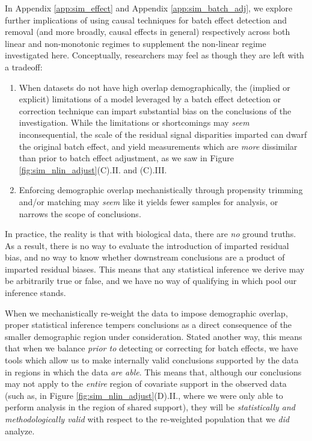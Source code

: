In Appendix \ref{app:sim_effect} and Appendix \ref{app:sim_batch_adj}, we explore further implications of using causal techniques for batch effect detection and removal (and more broadly, causal effects in general) respectively across both linear and non-monotonic regimes to supplement the non-linear regime investigated here. Conceptually, researchers may feel as though they are left with a tradeoff:
\begin{enumerate}[leftmargin=*]
    \item When datasets do not have high overlap demographically, the (implied or explicit) limitations of a model leveraged by a batch effect detection or correction technique can impart substantial bias on the conclusions of the investigation. While the limitations or shortcomings may \textit{seem} inconsequential, the scale of the residual signal disparities imparted can dwarf the original batch effect, and yield measurements which are \textit{more} dissimilar than prior to batch effect adjustment, as we saw in Figure \ref{fig:sim_nlin_adjust}(C).II. and (C).III.
    \item Enforcing demographic overlap mechanistically through propensity trimming and/or matching may \textit{seem} like it yields fewer samples for analysis, or narrows the scope of conclusions.
\end{enumerate}
In practice, the reality is that with biological data, there are \textit{no} ground truths. As a result, there is no way to evaluate the introduction of imparted residual bias, and no way to know whether downstream conclusions are a product of imparted residual biases. This means that any statistical inference we derive may be arbitrarily true or false, and we have no way of qualifying in which pool our inference stands. 

When we mechanistically re-weight the data to impose demographic overlap, proper statistical inference tempers conclusions as a direct consequence of the smaller demographic region under consideration. Stated another way, this means that when we balance \textit{prior to} detecting or correcting for batch effects, we have tools which allow us to make internally valid conclusions supported by the data in regions in which the data \textit{are able}. This means that, although our conclusions may not apply to the \textit{entire} region of covariate support in the observed data (such as, in Figure \ref{fig:sim_nlin_adjust}(D).II., where we were only able to perform analysis in the region of shared support), they will be \textit{statistically and methodologically valid} with respect to the re-weighted population that we \textit{did} analyze.

